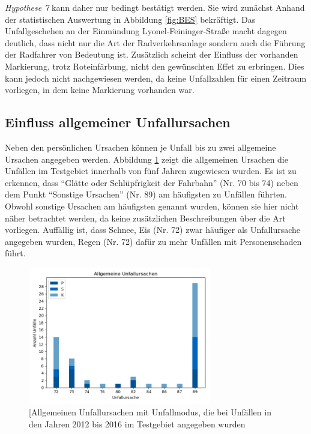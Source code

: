 \textit{Hypothese 7} kann daher nur bedingt bestätigt werden. Sie wird zunächst Anhand der statistischen Auswertung in Abbildung \ref{fig:BES} bekräftigt. Das Unfallgeschehen an der Einmündung Lyonel-Feininger-Straße macht dagegen deutlich, dass nicht nur die Art der Radverkehrsanlage sondern auch die Führung der Radfahrer von Bedeutung ist. Zusätzlich scheint der Einfluss der vorhanden Markierung, trotz Roteinfärbung, nicht den gewünschten Effet zu erbringen. Dies kann jedoch nicht nachgewiesen werden, da keine Unfallzahlen für einen Zeitraum vorliegen, in dem keine Markierung vorhanden war. 


\subsection{Einfluss allgemeiner Unfallursachen}
Neben den persönlichen Ursachen können je Unfall bis zu zwei allgemeine Ursachen angegeben werden. Abbildung \ref{fig:allg_Ursachen} zeigt die allgemeinen Ursachen die Unfällen im Testgebiet innerhalb von fünf Jahren zugewiesen wurden. Es ist zu erkennen, dass \enquote{Glätte oder Schlüpfrigkeit der Fahrbahn} (Nr. 70 bis 74) neben dem Punkt \enquote{Sonstige Ursachen} (Nr. 89) am häufigsten zu Unfällen führten. Obwohl sonstige Ursachen am häufigsten genannt wurden, können sie hier nicht näher betrachtet werden, da keine zusätzlichen Beschreibungen über die Art vorliegen. Auffällig ist, dass Schnee, Eis (Nr. 72) zwar häufiger als Unfallursache angegeben wurden, Regen (Nr. 72) dafür zu mehr Unfällen mit Personenschaden führt. 

\begin{savenotes}
	\begin{figure}[H]
		\centering
		\includegraphics[width=8cm,height=6cm]{figures/allg_Ursachen}
		\caption[Allgemeinen Unfallursachen mit Unfallmodus, die bei Unfällen in den Jahren 2012 bis 2016 im Testgebiet angegeben wurden]{[Allgemeinen Unfallursachen mit Unfallmodus, die bei Unfällen in den Jahren 2012 bis 2016 im Testgebiet angegeben wurden}\label{fig:allg_Ursachen}
	\end{figure}
\end{savenotes}

